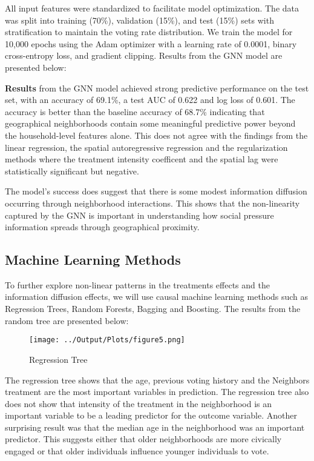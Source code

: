 \documentclass[11pt]{article}
\begin{document}
All input features were standardized to facilitate model optimization. The data was split into training (70\%), validation (15\%), and test (15\%) sets with stratification to maintain the voting rate distribution. We train the model for 10,000 epochs using the Adam optimizer with a learning rate of 0.0001, binary cross-entropy loss, and gradient clipping. Results from the GNN model are presented below:

\textbf{Results} from the GNN model achieved strong predictive performance on the test set, with an accuracy of 69.1\%, a test AUC of 0.622 and log loss of 0.601. The accuracy is better than the baseline accuracy of 68.7\% indicating that geographical neighborhoods contain some meaningful predictive power beyond the household-level features alone. This does not agree with the findings from the linear regression, the spatial autoregressive regression and the regularization methods where the treatment intensity coefficent and the spatial lag were statistically significant but negative.

The model's success does suggest that there is some modest information diffusion occurring through neighborhood interactions. This shows that the non-linearity captured by the GNN is important in understanding how social pressure information spreads through geographical proximity.

\subsection{Machine Learning Methods}
To further explore non-linear patterns in the treatments effects and the information diffusion effects, we will use causal machine learning methods such as Regression Trees, Random Forests, Bagging and Boosting. The results from the random tree are presented below:
\begin{figure}[H]
    \centering
    \texttt{[image: ../Output/Plots/figure5.png]}   
    \caption{Regression Tree}
    \label{fig:regression_tree}
\end{figure}
The regression tree shows that the age, previous voting history and the Neighbors treatment are the most important variables in prediction. The regression tree also does not show that intensity of the treatment in the neighborhood is an important variable to be a leading predictor for the outcome variable.  Another surprising result was that the median age in the neighborhood was an important predictor. This suggests either that older neighborhoods are more civically engaged or that older individuals influence younger individuals to vote.
\end{document}
